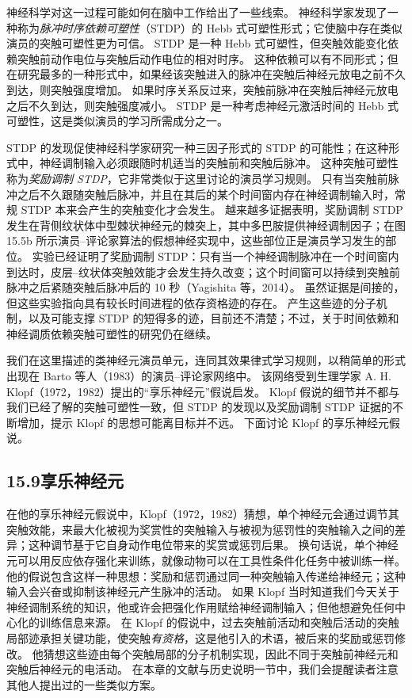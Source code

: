 \documentclass[UTF8,12pt,a4paper,fontset=fandol]{ctexart}
\begin{document}
神经科学对这一过程可能如何在脑中工作给出了一些线索。
神经科学家发现了一种称为\textit{脉冲时序依赖可塑性}（STDP）的 Hebb 式可塑性形式；它使脑中存在类似演员的突触可塑性更为可信。
STDP 是一种 Hebb 式可塑性，但突触效能变化依赖突触前动作电位与突触后动作电位的相对时序。
这种依赖可以有不同形式；但在研究最多的一种形式中，如果经该突触进入的脉冲在突触后神经元放电之前不久到达，则突触强度增加。
如果时序关系反过来，突触前脉冲在突触后神经元放电之后不久到达，则突触强度减小。
STDP 是一种考虑神经元激活时间的 Hebb 式可塑性，这是类似演员的学习所需成分之一。

STDP 的发现促使神经科学家研究一种三因子形式的 STDP 的可能性；在这种形式中，神经调制输入必须跟随时机适当的突触前和突触后脉冲。
这种突触可塑性称为\textit{奖励调制 STDP}，它非常类似于这里讨论的演员学习规则。
只有当突触前脉冲之后不久跟随突触后脉冲，并且在其后的某个时间窗内存在神经调制输入时，常规 STDP 本来会产生的突触变化才会发生。
越来越多证据表明，奖励调制 STDP 发生在背侧纹状体中型棘状神经元的棘突上，其中多巴胺提供神经调制因子；在图 15.5b 所示演员--评论家算法的假想神经实现中，这些部位正是演员学习发生的部位。
实验已经证明了奖励调制 STDP：只有当一个神经调制脉冲在一个时间窗内到达时，皮层--纹状体突触效能才会发生持久改变；这个时间窗可以持续到突触前脉冲之后紧随突触后脉冲后的 10 秒（Yagishita 等，2014）。
虽然证据是间接的，但这些实验指向具有较长时间进程的依存资格迹的存在。
产生这些迹的分子机制，以及可能支撑 STDP 的短得多的迹，目前还不清楚；不过，关于时间依赖和神经调质依赖突触可塑性的研究仍在继续。

我们在这里描述的类神经元演员单元，连同其效果律式学习规则，以稍简单的形式出现在 Barto 等人（1983）的演员--评论家网络中。
该网络受到生理学家 A. H. Klopf（1972，1982）提出的“享乐神经元”假说启发。
Klopf 假说的细节并不都与我们已经了解的突触可塑性一致，但 STDP 的发现以及奖励调制 STDP 证据的不断增加，提示 Klopf 的思想可能离目标并不远。
下面讨论 Klopf 的享乐神经元假说。

\subsection*{15.9\quad 享乐神经元}

在他的享乐神经元假说中，Klopf（1972，1982）猜想，单个神经元会通过调节其突触效能，来最大化被视为奖赏性的突触输入与被视为惩罚性的突触输入之间的差异；这种调节基于它自身动作电位带来的奖赏或惩罚后果。
换句话说，单个神经元可以用反应依存强化来训练，就像动物可以在工具性条件化任务中被训练一样。
他的假说包含这样一种思想：奖励和惩罚通过同一种突触输入传递给神经元；这种输入会兴奋或抑制该神经元产生脉冲的活动。
如果 Klopf 当时知道我们今天关于神经调制系统的知识，他或许会把强化作用赋给神经调制输入；但他想避免任何中心化的训练信息来源。
在 Klopf 的假说中，过去突触前活动和突触后活动的突触局部迹承担关键功能，使突触\textit{有资格}，这是他引入的术语，被后来的奖励或惩罚修改。
他猜想这些迹由每个突触局部的分子机制实现，因此不同于突触前神经元和突触后神经元的电活动。
在本章的文献与历史说明一节中，我们会提醒读者注意其他人提出过的一些类似方案。
\end{document}
